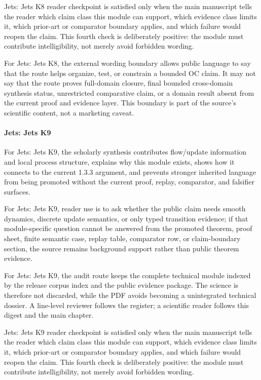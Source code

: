 Jets: Jets K8 reader checkpoint is satisfied only when the main manuscript tells the reader which claim class this module can support, which evidence class limits it, which prior-art or comparator boundary applies, and which failure would reopen the claim. This fourth check is deliberately positive: the module must contribute intelligibility, not merely avoid forbidden wording.


For Jets: Jets K8, the external wording boundary allows public language to say that the route helps organize, test, or constrain a bounded OC claim. It may not say that the route proves full-domain closure, final bounded cross-domain synthesis status, unrestricted comparative claim, or a domain result absent from the current proof and evidence layer. This boundary is part of the source's scientific content, not a marketing caveat.


\paragraph{Jets: Jets K9}

For Jets: Jets K9, the scholarly synthesis contributes flow/update information and local process structure, explains why this module exists, shows how it connects to the current 1.3.3 argument, and prevents stronger inherited language from being promoted without the current proof, replay, comparator, and falsifier surfaces.


For Jets: Jets K9, reader use is to ask whether the public claim needs smooth dynamics, discrete update semantics, or only typed transition evidence; if that module-specific question cannot be answered from the promoted theorem, proof sheet, finite semantic case, replay table, comparator row, or claim-boundary section, the source remains background support rather than public theorem evidence.


For Jets: Jets K9, the audit route keeps the complete technical module indexed by the release corpus index and the public evidence package. The science is therefore not discarded, while the PDF avoids becoming a unintegrated technical dossier. A line-level reviewer follows the register; a scientific reader follows this digest and the main chapter.


Jets: Jets K9 reader checkpoint is satisfied only when the main manuscript tells the reader which claim class this module can support, which evidence class limits it, which prior-art or comparator boundary applies, and which failure would reopen the claim. This fourth check is deliberately positive: the module must contribute intelligibility, not merely avoid forbidden wording.



